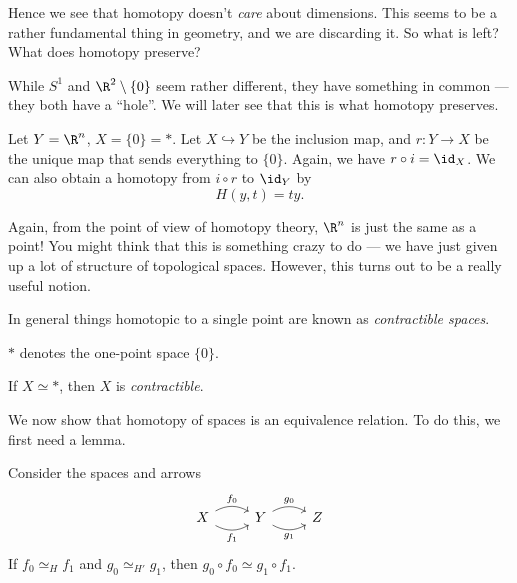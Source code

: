 \documentclass[a4paper]{article}
\begin{document}
Hence we see that homotopy doesn't \emph{care} about dimensions. This seems to be a rather fundamental thing in geometry, and we are discarding it. So what is left? What does homotopy preserve?

While $S^1$ and $\R^2 \setminus \{0\}$ seem rather different, they have something in common --- they both have a ``hole''. We will later see that this is what homotopy preserves.

\begin{eg}
  Let $Y = \R^n$, $X = \{0\} = *$. Let $X\hookrightarrow Y$ be the inclusion map, and $r: Y\to X$ be the unique map that sends everything to $\{0\}$. Again, we have $r\circ i = \id_X$. We can also obtain a homotopy from $i \circ r$ to $\id_Y$ by
  \[
    H(y, t) = ty.
  \]
\end{eg}
Again, from the point of view of homotopy theory, $\R^n$ is just the same as a point! You might think that this is something crazy to do --- we have just given up a lot of structure of topological spaces. However, this turns out to be a really useful notion.

In general things homotopic to a single point are known as \emph{contractible spaces}.
\begin{notation}
  $*$ denotes the one-point space $\{0\}$.
\end{notation}

\begin{defi}
  If $X\simeq *$, then $X$ is \emph{contractible}.
\end{defi}

We now show that homotopy of spaces is an equivalence relation. To do this, we first need a lemma.
\begin{lemma}
  Consider the spaces and arrows
  \[
    \begin{tikzcd}
      X \ar[r, bend left, "f_0"] \ar[r, bend right, "f_1"'] & Y \ar[r, bend left, "g_0"] \ar[r, bend right, "g_1"'] & Z
    \end{tikzcd}
  \]
  If $f_0\simeq_H f_1$ and $g_0\simeq_{H'} g_1$, then $g_0\circ f_0 \simeq g_1 \circ f_1$.
\end{lemma}
\end{document}

